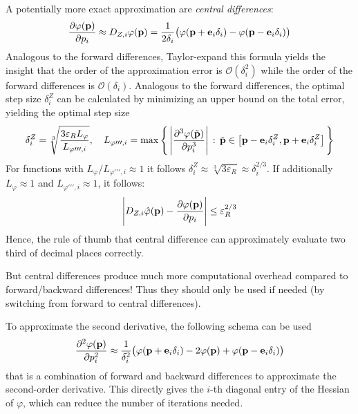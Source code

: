 			A potentially more exact approximation are \emph{central differences}:
			\begin{align*}
				\pdv{\varphi(\boldsymbol{\mathrm{p}})}{p_i} \approx D_{Z, i}\varphi(\boldsymbol{\mathrm{p}}) = \frac{1}{2 \delta_i} \big( \varphi(\boldsymbol{\mathrm{p}} + \boldsymbol{\mathrm{e}}_i \delta_i) - \varphi(\boldsymbol{\mathrm{p}} - \boldsymbol{\mathrm{e}}_i \delta_i) \big)
			\end{align*}
			Analogous to the forward differences, Taylor-expand this formula yields the insight that the order of the approximation error is \( \mathcal{O}(\delta_i^2) \) while the order of the forward differences is \( \mathcal{O}(\delta_i) \). Analogous to the forward differences, the optimal step size \( \delta_i^Z \) can be calculated by minimizing an upper bound on the total error, yielding the optimal step size
			\begin{align*}
				\delta_i^Z = \sqrt[3]{\frac{3 \varepsilon_R L_\varphi}{L_{\varphi\prime\prime\prime, i}}},\quad L_{\varphi\prime\prime\prime, i} = \max\Bigg\{\, \Bigg\lvert \pdv[3]{\varphi(\tilde{\boldsymbol{\mathrm{p}}})}{p_i} \Bigg\rvert \,:\, \tilde{\boldsymbol{\mathrm{p}}} \in \big[ \boldsymbol{\mathrm{p}} - \boldsymbol{\mathrm{e}}_i \delta_i^Z, \boldsymbol{\mathrm{p}} + \boldsymbol{\mathrm{e}}_i \delta_i^Z \big] \,\Bigg\}
			\end{align*}
			For functions with \( L_\varphi / L_{\varphi\prime\prime\prime, i} \approx 1 \) it follows \( \delta_i^Z \approx \sqrt[3]{3\varepsilon_R} \approx \delta_i^{2/3} \). If additionally \( L_\varphi \approx 1 \) and \( L_{\varphi\prime\prime\prime, i} \approx 1 \), it follows:
			\begin{align*}
				\Bigg\lvert D_{Z, i}\hat{\varphi}(\boldsymbol{\mathrm{p}}) - \pdv{\varphi(\boldsymbol{\mathrm{p}})}{p_i} \Bigg\rvert \leq \varepsilon_R^{2/3}
			\end{align*}
			Hence, the rule of thumb that central difference can approximately evaluate two third of decimal places correctly.
			
			But central differences produce much more computational overhead compared to forward/backward differences! Thus they should only be used if needed (by switching from forward to central differences).
			
			To approximate the second derivative, the following schema can be used
			\begin{align*}
				\pdv[2]{\varphi(\boldsymbol{\mathrm{p}})}{p_i} \approx \frac{1}{\delta_i^2} \big( \varphi(\boldsymbol{\mathrm{p}} + \boldsymbol{\mathrm{e}}_i \delta_i) - 2\varphi(\boldsymbol{\mathrm{p}}) + \varphi(\boldsymbol{\mathrm{p}} - \boldsymbol{\mathrm{e}}_i \delta_i) \big)
			\end{align*}
			that is a combination of forward and backward differences to approximate the second-order derivative. This directly gives the \(i\)-th diagonal entry of the Hessian of \(\varphi\), which can reduce the number of iterations needed.

